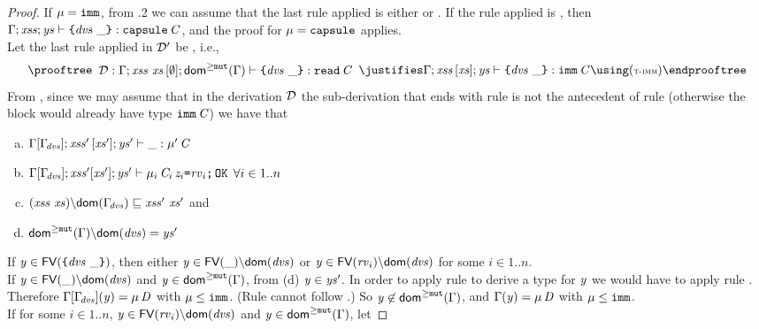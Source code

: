 {\begin{proof}
\medskip\noindent
If \underline{$\mu=\texttt{imm}$}, from .2 we can assume that the last rule
applied is either  or . If the rule
applied is , then 
$\Gamma;\mathit{xss};\mathit{ys}\vdash \texttt{\{}\mathit{dvs}\ \_\texttt{\}}:\texttt{capsule}\,\mathit{C}
$, and the proof for $\mu=\texttt{capsule}$ applies. \\
Let the last rule applied in ${\cal D}'$ be , i.e.,
\[
\prooftree
\begin{array}{c}
\deriv:\AuxTypeCheck{\Gamma}{\LentLocked\ \xs}{\emptyset}{\domGeqMut(\Gamma) }{\Block{\dvs}{\_}}{\Type{\readable}{\C}}
\end{array}
\justifies
\AuxTypeCheck{\Gamma}{\LentLocked}{\MutGroup}{\StronglyLocked}{\Block{\dvs}{\_}}{\Type{\imm}{\C}}
\using
\rn{t-imm}
\endprooftree
\]
From , since we may assume that in the derivation ${\cal D}$ the sub-derivation
that ends with rule  is not the antecedent of rule  (otherwise the block would already have type $\texttt{imm}\,\mathit{C}$) we have that
\begin{enumerate}[(a)]
\item  ${\Gamma[\Gamma_{\!\mathit{dvs}}]};{\mathit{xss}'}\,[\mathit{xs}'];\mathit{ys}'\vdash \_:\mu'\,\mathit{C}$ 
\item $\Gamma[\Gamma_{\!\mathit{dvs}}];\mathit{xss}'[\mathit{xs}'];\mathit{ys}'\vdash \mu_i\,\mathit{C}_i\,\mathit{z}_i\texttt{=}\mathit{rv}_i\texttt{;}\,{\tt OK}$  $\forall i\in1..n$
\item $\LessEq{(\LentLocked\ \xs){\setminus}\dom{\TypeEnv{\dvs}}}{\LentLocked'\ \xs'}$ and
\item ${\textsf{dom}^{\geq\texttt{mut}}}(\Gamma){\setminus}\textsf{dom}(\mathit{dvs})=\mathit{ys}'$ 
\end{enumerate}
If $\mathit{y}\in\textsf{FV}(\texttt{\{}\mathit{dvs}\ \_\texttt{\}})$, then either $\mathit{y}\in\textsf{FV}({\_}){\setminus}\textsf{dom}(\mathit{dvs})$ or $\mathit{y}\in\textsf{FV}(\mathit{rv}_i){\setminus}\textsf{dom}(\mathit{dvs})$ for some $i\in 1..n$.\\
If $\mathit{y}\in\textsf{FV}({\_}){\setminus}\textsf{dom}(\mathit{dvs})$ and $\mathit{y}\in{\textsf{dom}^{\geq\texttt{mut}}}(\Gamma)$, from (d) $\mathit{y}\in\mathit{ys}'$. In order to apply rule  to derive a type for $\mathit{y}$ we
would have to apply rule . Therefore $\Gamma[\Gamma_{\!\mathit{dvs}}](\mathit{y})=\mu\,\mathit{D}$ with $\mu\leq\texttt{imm}$.
(Rule  cannot follow .) So $\mathit{y}\not\in{\textsf{dom}^{\geq\texttt{mut}}}(\Gamma)$, and $\Gamma(\mathit{y})=\mu\,\mathit{D}$ with $\mu\leq\texttt{imm}$.\\
If for some $i\in 1..n$, $\mathit{y}\in\textsf{FV}(\mathit{rv}_i){\setminus}\textsf{dom}(\mathit{dvs})$ and $\mathit{y}\in{\textsf{dom}^{\geq\texttt{mut}}}(\Gamma)$, let 

\end{proof}}
